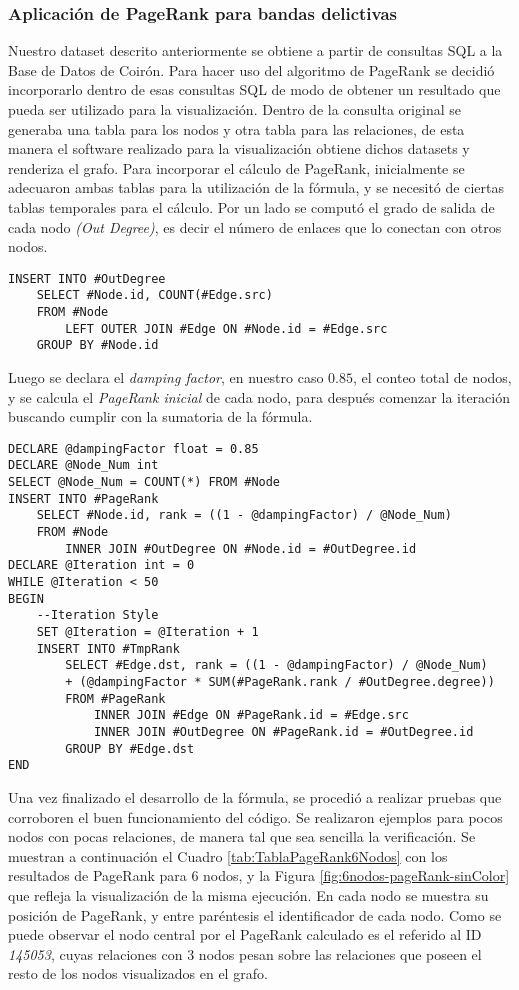 \subsubsection{Aplicación de PageRank para bandas delictivas}
Nuestro dataset descrito anteriormente se obtiene a partir de consultas SQL a la Base de Datos de Coirón. Para hacer uso del algoritmo de PageRank se decidió incorporarlo dentro de esas consultas SQL de modo de obtener un resultado que pueda ser utilizado para la visualización. Dentro de la consulta original se generaba una tabla para los nodos y otra tabla para las relaciones, de esta manera el software realizado para la visualización obtiene dichos datasets y renderiza el grafo.
Para incorporar el cálculo de PageRank, inicialmente se adecuaron ambas tablas para la utilización de la fórmula, y se necesitó de ciertas tablas temporales para el cálculo. Por un lado se computó el grado de salida de cada nodo \textit{(Out Degree)}, es decir el número de enlaces que lo conectan con otros nodos.

\begin{verbatim}
INSERT INTO #OutDegree
	SELECT #Node.id, COUNT(#Edge.src)
	FROM #Node 
		LEFT OUTER JOIN #Edge ON #Node.id = #Edge.src
	GROUP BY #Node.id		
\end{verbatim}

Luego se declara el \textit{damping factor}, en nuestro caso $0.85$, el conteo total de nodos, y se calcula el \textit{PageRank inicial} de cada nodo, para después comenzar la iteración buscando cumplir con la sumatoria de la fórmula.

\begin{verbatim}
DECLARE @dampingFactor float = 0.85
DECLARE @Node_Num int
SELECT @Node_Num = COUNT(*) FROM #Node
INSERT INTO #PageRank
	SELECT #Node.id, rank = ((1 - @dampingFactor) / @Node_Num)
	FROM #Node 
		INNER JOIN #OutDegree ON #Node.id = #OutDegree.id
DECLARE @Iteration int = 0
WHILE @Iteration < 50
BEGIN
	--Iteration Style
	SET @Iteration = @Iteration + 1
	INSERT INTO #TmpRank
		SELECT #Edge.dst, rank = ((1 - @dampingFactor) / @Node_Num) 
		+ (@dampingFactor * SUM(#PageRank.rank / #OutDegree.degree))
		FROM #PageRank 
			INNER JOIN #Edge ON #PageRank.id = #Edge.src
			INNER JOIN #OutDegree ON #PageRank.id = #OutDegree.id
		GROUP BY #Edge.dst
END
\end{verbatim}

Una vez finalizado el desarrollo de la fórmula, se procedió a realizar pruebas que corroboren el buen funcionamiento del código. Se realizaron ejemplos para pocos nodos con pocas relaciones, de manera tal que sea sencilla la verificación. Se muestran a continuación el Cuadro \ref{tab:TablaPageRank6Nodos} con los resultados de PageRank para 6 nodos, y la Figura \ref{fig:6nodos-pageRank-sinColor} que refleja la visualización de la misma ejecución. En cada nodo se muestra su posición de PageRank, y entre paréntesis el identificador de cada nodo. Como se puede observar el nodo central por el PageRank calculado es el referido al ID \textit{145053}, cuyas relaciones con 3 nodos pesan sobre las relaciones que poseen el resto de los nodos visualizados en el grafo.

